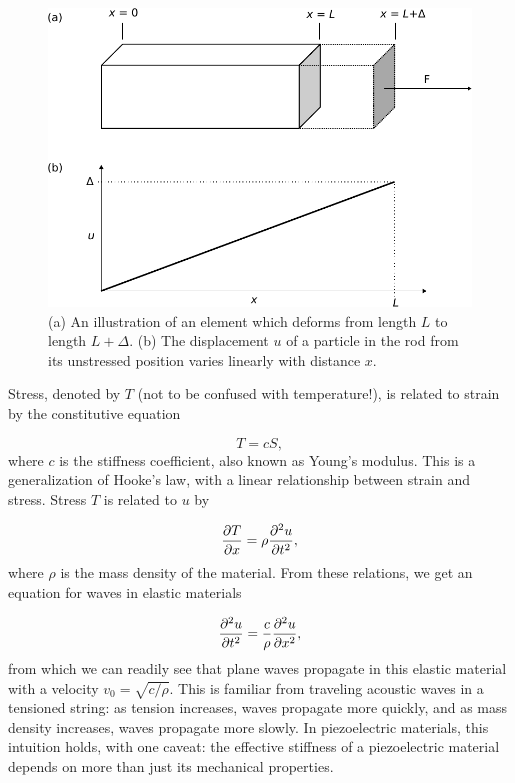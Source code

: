 \documentclass[double,12pt,1in,seploa]{beavtex}
\begin{document}
\begin{figure}
    \includegraphics{displacement field.pdf}
    \caption{(a) An illustration of an element which deforms from length $L$ to length $L + \Delta$. (b) The displacement $u$ of a particle in the rod from its unstressed position varies linearly with distance $x$.} \label{dfield}
\end{figure}
Stress, denoted by $T$ (not to be confused with temperature!), is related to strain by the constitutive equation

\begin{equation}
    T = cS, \label{elastic Hooke's}
\end{equation}
where $c$ is the stiffness coefficient, also known as Young's modulus. This is a generalization of Hooke's law, with a linear relationship between strain and stress. Stress $T$ is related to $u$ by 

\begin{equation}
    \pdv{T}{x} = \rho \pdv[2]{u}{t}, \label{stress related to displacement}
\end{equation}
where $\rho$ is the mass density of the material. From these relations, we get an equation for waves in elastic materials

\begin{equation}
    \pdv[2]{u}{t} = \frac{c}{\rho} \pdv[2]{u}{x},
\end{equation}
from which we can readily see that plane waves propagate in this elastic material with a velocity $v_0 = \sqrt{c/\rho}$. This is familiar from traveling acoustic waves in a tensioned string: as tension increases, waves propagate more quickly, and as mass density increases, waves propagate more slowly. In piezoelectric materials, this intuition holds, with one caveat: the effective stiffness of a piezoelectric material depends on more than just its mechanical properties.
\end{document}
